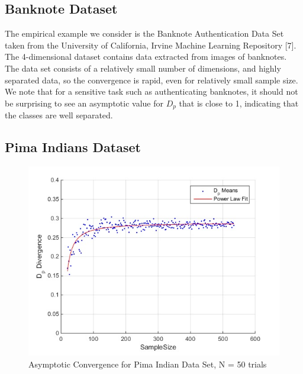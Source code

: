 \documentclass{article}
\begin{document}
	\newpage
	\subsection{\small Banknote Dataset}
	\indent The empirical example we consider is the Banknote Authentication Data Set taken from the University of California, Irvine Machine Learning Repository [7]. The 4-dimensional dataset contains data extracted from images of banknotes. The data set consists of a relatively small number of dimensions, and highly separated data, so the convergence is rapid, even for relatively small sample size. We note that for a sensitive task such as authenticating banknotes, it should not be surprising to see an asymptotic value for $D_p$ that is close to 1, indicating that the classes are well separated.  
	
	\newpage
	\subsection{\small Pima Indians Dataset}
	
	\begin{figure}[!h]
		\caption{Asymptotic Convergence for Pima Indian Data Set, N = 50 trials}
		\centering
		\includegraphics[scale=0.6]{dp_n50_pima}
	\end{figure}
	
\end{document}
